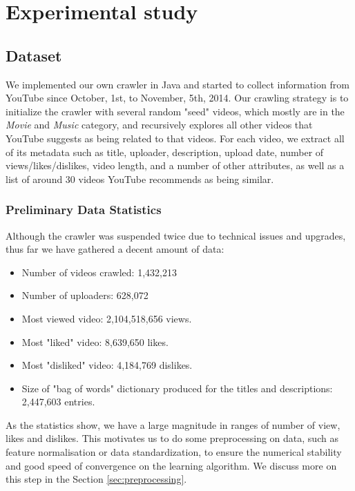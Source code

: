 \section{Experimental study}
\label{sec:experiment}

	\subsection{Dataset}
	We implemented our own crawler in Java and started to collect information from YouTube since October, 1st, to November, 5th, 2014. Our crawling strategy is to initialize the crawler with several random "seed" videos, which mostly are in the \textit{Movie} and \textit{Music} category, and recursively explores all other videos that YouTube suggests as being related to that videos. For each video, we extract all of its metadata such as title, uploader, description, upload date, number of views/likes/dislikes, video length, and a number of other attributes, as well as a list of around 30 videos YouTube recommends as being similar. 

		\subsubsection{Preliminary Data Statistics}

		Although the crawler was suspended twice due to technical issues and upgrades, thus far we have gathered a decent amount of data:

		\begin{itemize}
			\item Number of videos crawled: 1,432,213
			\item Number of uploaders: 628,072
			\item Most viewed video: 2,104,518,656 views.
			\item Most "liked" video: 8,639,650 likes.
			\item Most "disliked" video: 4,184,769 dislikes.
			\item Size of "bag of words" dictionary produced for the titles and descriptions: 2,447,603 entries.
		\end{itemize}

		As the statistics show, we have a large magnitude in ranges of number of view, likes and dislikes. This motivates us to do some preprocessing on data, such as feature normalisation or data standardization, to ensure the numerical stability and good speed of convergence on the learning algorithm. We discuss more on this step in the Section \ref{sec:preprocessing}.
		
